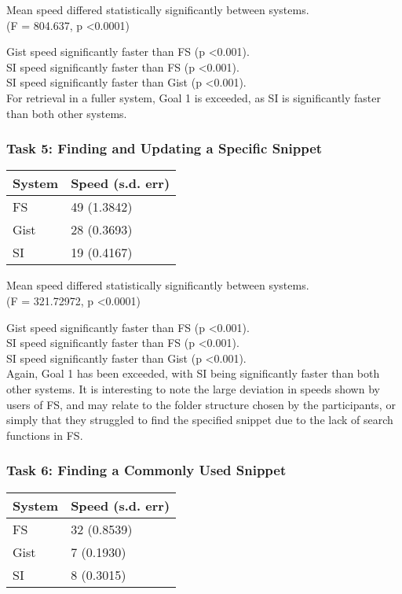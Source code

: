 Mean speed differed statistically significantly between systems. \\
(F = 804.637, p \textless 0.0001)

Gist speed significantly faster than FS (p \textless  0.001). \\
SI speed significantly faster than FS (p \textless  0.001). \\
SI speed significantly faster than Gist (p \textless  0.001). \\

For retrieval in a fuller system, Goal 1 is exceeded, as SI is significantly faster than both other systems.


\subsubsection{Task 5: Finding and Updating a Specific Snippet}
\begin{table}[H]
\label{speedtabletask5}
\begin{tabular}{ll}
\hline
\textbf{System} & \textbf{Speed (s.d. err)} \\ \hline
FS              & 49 (1.3842)     \\ 
Gist            & 28 (0.3693)     \\ 
SI              & 19 (0.4167)     \\ \hline
\end{tabular}
\end{table}

Mean speed differed statistically significantly between systems. \\
(F = 321.72972, p \textless 0.0001)

Gist speed significantly faster than FS (p \textless  0.001). \\
SI speed significantly faster than FS (p \textless  0.001). \\
SI speed significantly faster than Gist (p \textless  0.001). \\

Again, Goal 1 has been exceeded, with SI being significantly faster than both other systems. 
It is interesting to note the large deviation in speeds shown by users of FS, and may relate to the folder structure chosen by the participants, or simply that they struggled to find the specified snippet due to the lack of search functions in FS.

\subsubsection{Task 6: Finding a Commonly Used Snippet}
\begin{table}[H]
\label{speedtabletask6}
\begin{tabular}{ll}
\hline
\textbf{System} & \textbf{Speed (s.d. err)} \\ \hline
FS              & 32 (0.8539)     \\ 
Gist            & 7 (0.1930)     \\ 
SI              & 8 (0.3015)     \\ \hline
\end{tabular}
\end{table}


